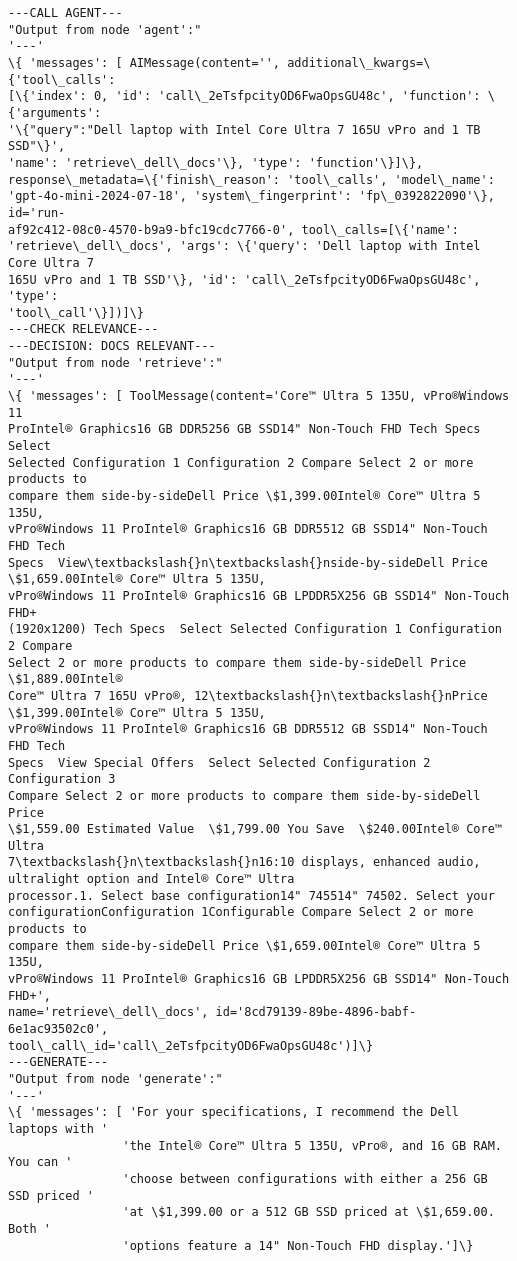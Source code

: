 \documentclass[11pt]{article}
\begin{document}
    \begin{Verbatim}[commandchars=\\\{\}]
---CALL AGENT---
"Output from node 'agent':"
'---'
\{ 'messages': [ AIMessage(content='', additional\_kwargs=\{'tool\_calls':
[\{'index': 0, 'id': 'call\_2eTsfpcityOD6FwaOpsGU48c', 'function': \{'arguments':
'\{"query":"Dell laptop with Intel Core Ultra 7 165U vPro and 1 TB SSD"\}',
'name': 'retrieve\_dell\_docs'\}, 'type': 'function'\}]\},
response\_metadata=\{'finish\_reason': 'tool\_calls', 'model\_name':
'gpt-4o-mini-2024-07-18', 'system\_fingerprint': 'fp\_0392822090'\}, id='run-
af92c412-08c0-4570-b9a9-bfc19cdc7766-0', tool\_calls=[\{'name':
'retrieve\_dell\_docs', 'args': \{'query': 'Dell laptop with Intel Core Ultra 7
165U vPro and 1 TB SSD'\}, 'id': 'call\_2eTsfpcityOD6FwaOpsGU48c', 'type':
'tool\_call'\}])]\}
---CHECK RELEVANCE---
---DECISION: DOCS RELEVANT---
"Output from node 'retrieve':"
'---'
\{ 'messages': [ ToolMessage(content='Core™ Ultra 5 135U, vPro®Windows 11
ProIntel® Graphics16 GB DDR5256 GB SSD14" Non-Touch FHD Tech Specs  Select
Selected Configuration 1 Configuration 2 Compare Select 2 or more products to
compare them side-by-sideDell Price \$1,399.00Intel® Core™ Ultra 5 135U,
vPro®Windows 11 ProIntel® Graphics16 GB DDR5512 GB SSD14" Non-Touch FHD Tech
Specs  View\textbackslash{}n\textbackslash{}nside-by-sideDell Price \$1,659.00Intel® Core™ Ultra 5 135U,
vPro®Windows 11 ProIntel® Graphics16 GB LPDDR5X256 GB SSD14" Non-Touch FHD+
(1920x1200) Tech Specs  Select Selected Configuration 1 Configuration 2 Compare
Select 2 or more products to compare them side-by-sideDell Price \$1,889.00Intel®
Core™ Ultra 7 165U vPro®, 12\textbackslash{}n\textbackslash{}nPrice \$1,399.00Intel® Core™ Ultra 5 135U,
vPro®Windows 11 ProIntel® Graphics16 GB DDR5512 GB SSD14" Non-Touch FHD Tech
Specs  View Special Offers  Select Selected Configuration 2 Configuration 3
Compare Select 2 or more products to compare them side-by-sideDell Price
\$1,559.00 Estimated Value  \$1,799.00 You Save  \$240.00Intel® Core™ Ultra
7\textbackslash{}n\textbackslash{}n16:10 displays, enhanced audio, ultralight option and Intel® Core™ Ultra
processor.1. Select base configuration14" 745514" 74502. Select your
configurationConfiguration 1Configurable Compare Select 2 or more products to
compare them side-by-sideDell Price \$1,659.00Intel® Core™ Ultra 5 135U,
vPro®Windows 11 ProIntel® Graphics16 GB LPDDR5X256 GB SSD14" Non-Touch FHD+',
name='retrieve\_dell\_docs', id='8cd79139-89be-4896-babf-6e1ac93502c0',
tool\_call\_id='call\_2eTsfpcityOD6FwaOpsGU48c')]\}
---GENERATE---
"Output from node 'generate':"
'---'
\{ 'messages': [ 'For your specifications, I recommend the Dell laptops with '
                'the Intel® Core™ Ultra 5 135U, vPro®, and 16 GB RAM. You can '
                'choose between configurations with either a 256 GB SSD priced '
                'at \$1,399.00 or a 512 GB SSD priced at \$1,659.00. Both '
                'options feature a 14" Non-Touch FHD display.']\}
    \end{Verbatim}
\end{document}

